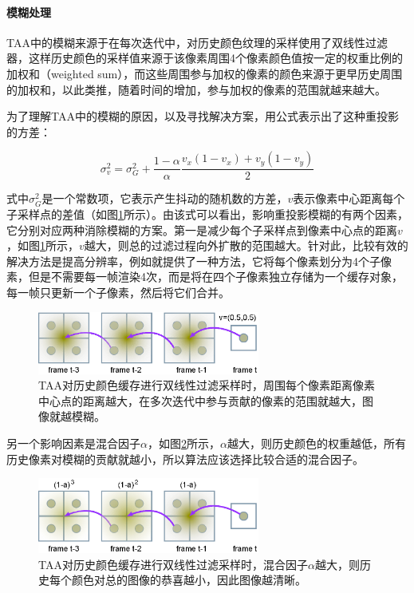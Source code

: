 \paragraph{模糊处理}
TAA中的模糊来源于在每次迭代中，对历史颜色纹理的采样使用了双线性过滤器，这样历史颜色的采样值来源于该像素周围4个像素颜色值按一定的权重比例的加权和（weighted sum），而这些周围参与加权的像素的颜色来源于更早历史周围的加权和，以此类推，随着时间的增加，参与加权的像素的范围就越来越大。

为了理解TAA中的模糊的原因，以及寻找解决方案，\cite{a:AmortizedSupersampling}用公式表示出了这种重投影的方差：

\begin{equation}
	\sigma^{2}_v=\sigma^{2}_G+\frac{1-\alpha}{\alpha}\frac{v_x (1-v_x)+v_y(1-v_y)}{2}
\end{equation}

式中$\sigma^{2}_G$是一个常数项，它表示产生抖动的随机数的方差，$v$表示像素中心距离每个子采样点的差值（如图\ref{f:shade-blur-factor-filter}所示）。由该式可以看出，影响重投影模糊的有两个因素，它分别对应两种消除模糊的方案。第一是减少每个子采样点到像素中心点的距离$v$，如图\ref{f:shade-blur-factor-filter}所示，$v$越大，则总的过滤过程向外扩散的范围越大。针对此，比较有效的解决方法是提高分辨率，例如\cite{a:AmortizedSupersampling}就提供了一种方法，它将每个像素划分为4个子像素，但是不需要每一帧渲染4次，而是将在四个子像素独立存储为一个缓存对象，每一帧只更新一个子像素，然后将它们合并。

\begin{figure}
	\sidecaption
	\includegraphics[width=0.65\textwidth]{figures/shade/blur-factor-filter}
	\caption{TAA对历史颜色缓存进行双线性过滤采样时，周围每个像素距离像素中心点的距离越大，在多次迭代中参与贡献的像素的范围就越大，图像就越模糊。}
	\label{f:shade-blur-factor-filter}
\end{figure}

另一个影响因素是混合因子$\alpha$，如图\ref{f:shade-blur-factor-alpha}所示，$\alpha$越大，则历史颜色的权重越低，所有历史像素对模糊的贡献就越小，所以算法应该选择比较合适的混合因子。

\begin{figure}
	\sidecaption
	\includegraphics[width=0.65\textwidth]{figures/shade/blur-factor-alpha}
	\caption{TAA对历史颜色缓存进行双线性过滤采样时，混合因子$\alpha$越大，则历史每个颜色对总的图像的恭喜越小，因此图像越清晰。}
	\label{f:shade-blur-factor-alpha}
\end{figure}

